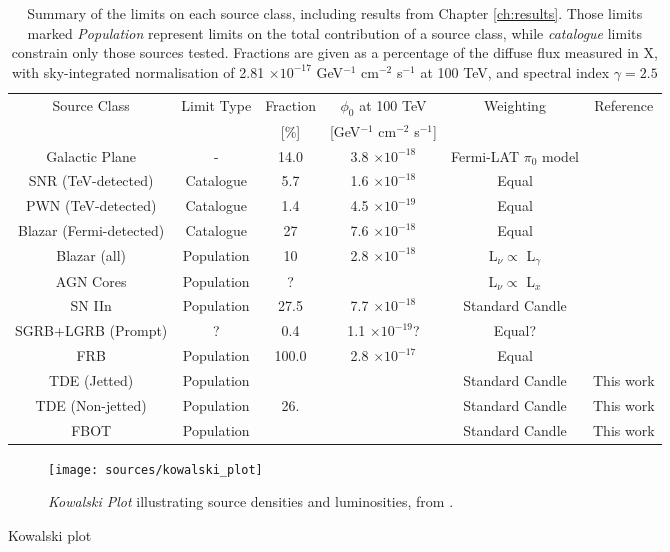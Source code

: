 \begin{table*}[]
	\centering
	\begin{tabular}{|c c c c c c|} 
		\hline
		Source Class & Limit Type & Fraction & $\phi_{0}$ at 100 TeV & Weighting & Reference\\ 
		&&[\%]&[GeV$^{-1}$ cm$^{-2}$ s$^{-1}$]&&\\
		\hline
		Galactic Plane & - & 14.0 &  3.8 $\times 10^{-18}$  & Fermi-LAT $\pi_{0}$ model &\cite{ic_17_galactic}\\
		SNR (TeV-detected) & Catalogue & 5.7 & 1.6  $\times 10^{-18}$ & Equal & \cite{ic_17_galactic}\\
		PWN (TeV-detected) & Catalogue & 1.4 & 4.5 $\times 10^{-19}$ & Equal &  \cite{ic_20_pwn}\\
		\hline
		Blazar (Fermi-detected) & Catalogue & 27&7.6 $\times 10^{-18}$& Equal & \cite{ic_blazar_17}\\
		Blazar (all) & Population &10&2.8 $\times 10^{-18}$& L$_{\nu} \propto$ L$_{\gamma}$& \cite{ic_blazar_17}\\
		AGN Cores & Population &?&& L$_{\nu} \propto$ L$_{x}$&\\
		SN IIn & Population & 27.5 &7.7 $\times 10^{-18}$&Standard Candle&\cite{Stasik2018Search}\\
		SGRB+LGRB (Prompt) & ? & 0.4 &1.1 $\times 10^{-19}$?&Equal?&\cite{ic_grb_17}\\
		FRB & Population & 100.0 & 2.8 $\times 10^{-17}$& Equal & \cite{ic_frb_20}\\
		TDE (Jetted) &Population&& &Standard Candle & This work\\
		TDE (Non-jetted) & Population &26.& &Standard Candle & This work\\
		FBOT & Population &&& Standard Candle & This work\\
		\hline
	\end{tabular}
	\caption{Summary of the limits on each source class, including results from Chapter \ref{ch:results}. Those limits marked \emph{Population} represent limits on the total contribution of a source class, while \emph{catalogue} limits constrain only those sources tested. Fractions are given as a percentage of the diffuse flux measured in X, with sky-integrated normalisation of 2.81 $\times 10^{-17}$ GeV$^{-1}$ cm$^{-2}$ s$^{-1}$ at 100 TeV, and spectral index $\gamma=2.5$}
	\label{tab:source_limits}
\end{table*}{}

\begin{figure}[!ht]
	\centering \texttt{[image: sources/kowalski\_plot]}
	\caption{\emph{Kowalski Plot} illustrating source densities and luminosities, from \cite{ic_gen2_20}.}
	\label{fig:kowalski_plot}
\end{figure}

Kowalski plot